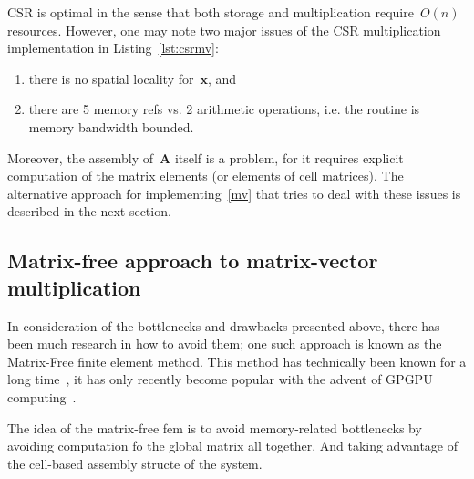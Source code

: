 \documentclass[12pt]{article}
\newcommand{\vect}[1]{\boldsymbol{\mathbf{#1}}}
\begin{document}
CSR is optimal in the sense that both storage and multiplication require~$O(n)$ resources. However, one may note two major issues of the CSR multiplication implementation in Listing~\ref{lst:csrmv}:
\begin{enumerate}
	\item there is no spatial locality for~$\vect x$, and
	\item there are 5 memory refs vs. 2 arithmetic operations, i.e. the routine is memory bandwidth bounded.
\end{enumerate}
Moreover, the assembly of~$\vect A$ itself is a problem, for it requires explicit computation of the matrix elements (or elements of cell matrices). The alternative approach for implementing~\eqref{mv} that tries to deal with these issues is described in the next section.

\subsection{Matrix-free approach to matrix-vector multiplication}\label{sec:mfree}

In consideration of the bottlenecks and drawbacks presented above, there has been much research in how to avoid them; one such approach is known as the Matrix-Free finite element method. This method has technically been known for a long time~\cite{carey1988element}, it has only recently become popular with the advent of GPGPU computing~\cite{step37}. 

The idea of the matrix-free fem is to avoid memory-related bottlenecks by avoiding computation fo the global matrix all together. And taking advantage of the cell-based assembly structe of the system. 
\end{document}
